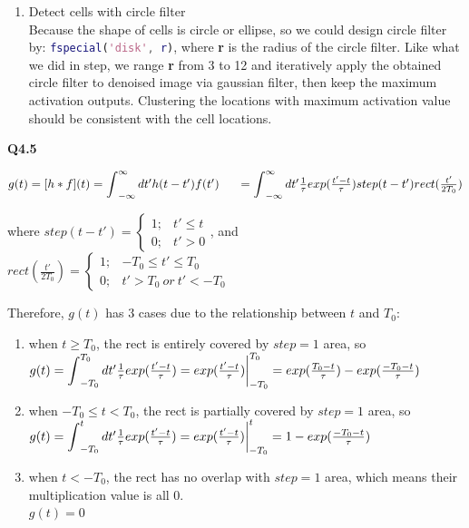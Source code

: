 \documentclass[12pt,a4paper]{article}
\newcommand{\bint}{\mathop{\mathlarger{\int}}}
\begin{document}
\begin{enumerate}
        \item Detect cells with circle filter\\
        Because the shape of cells is circle or ellipse, so we could design circle filter by: 
        \lstinline[language=matlab]{fspecial('disk', r)}, where \textbf{r} is the radius of the circle filter. Like what we did in step, we range \textbf{r} from 3 to 12 and iteratively apply the obtained circle filter to denoised image via gaussian filter, then keep the maximum activation outputs. Clustering the locations with maximum activation value should be consistent with the cell locations. 
    \end{enumerate}

    \newpage
    \Large{\textbf{Q4.5}}

    $g(t)=[h*f](t)=\bint_{-\infty}^\infty dt'h(t-t')f(t')\\
    \indent =\bint_{-\infty}^\infty dt' \frac{1}{\tau}exp(\frac{t'-t}{\tau})step(t-t') rect(\frac{t'}{2T_0})$

    where $step(t-t')=\begin{cases}
    1; & t'\le t\\
    0; & t'>0
    \end{cases}$,  
    and $rect(\frac{t'}{2T_0})=\begin{cases}
    1; & -T_0 \le t' \le T_0 \\
    0; & t' > T_0\ or\ t' < -T_0
    \end{cases}$

    Therefore, $g(t)$ has 3 cases due to the relationship between $t$ and $T_0$:
    \begin{enumerate}
    \item when $t\ge T_0$, the rect is entirely covered by $step=1$ area, so \\
    $g(t)=\bint_{-T_0}^{T_0}dt' \frac{1}{\tau}exp(\frac{t'-t}{\tau})=exp(\frac{t'-t}{\tau})\bigg|_{-T_0}^{T_0}=exp(\frac{T_0-t}{\tau})-exp(\frac{-T_0-t}{\tau})$
    \item when $-T_0\le t<T_0$, the rect is partially covered by $step=1$ area, so \\
    $g(t)=\bint_{-T_0}^{t}dt' \frac{1}{\tau}exp(\frac{t'-t}{\tau})=exp(\frac{t'-t}{\tau})\bigg|_{-T_0}^{t}=1-exp(\frac{-T_0-t}{\tau})$
    \item when $t < -T_0$, the rect has no overlap with $step=1$ area, which means their multiplication value is all 0. \\
    $g(t)=0$
    \end{enumerate}
\end{document}
